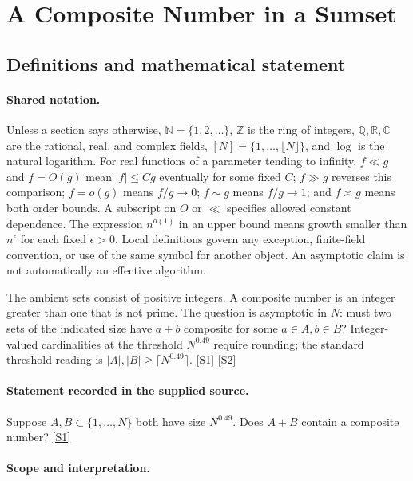 \documentclass[11pt,a4paper]{article}
\newcommand{\N}{\mathbb{N}}
\newcommand{\Z}{\mathbb{Z}}
\newcommand{\Q}{\mathbb{Q}}
\newcommand{\R}{\mathbb{R}}
\newcommand{\C}{\mathbb{C}}
\newcommand{\sref}[2]{\hyperlink{source:#1:#2}{[S#2]}}
\begin{document}
\section{A Composite Number in a Sumset}\label{statement}


\subsection{Definitions and mathematical statement}

\paragraph{Shared notation.}Unless a section says otherwise, $\N=\{1,2,\ldots\}$,
$\Z$ is the ring of integers, $\Q,\R,\C$ are the rational, real, and complex
fields, $[N]=\{1,\ldots,\lfloor N\rfloor\}$, and $\log$ is the natural
logarithm. For real functions of a parameter tending to infinity,
$f\ll g$ and $f=O(g)$ mean $|f|\leq Cg$ eventually for some fixed $C$;
$f\gg g$ reverses this comparison; $f=o(g)$ means $f/g\to0$;
$f\sim g$ means $f/g\to1$; and $f\asymp g$ means both order bounds.
A subscript on $O$ or $\ll$ specifies allowed constant dependence.
The expression $n^{o(1)}$ in an upper bound means growth smaller than
$n^\epsilon$ for each fixed $\epsilon>0$. Local definitions govern any
exception, finite-field convention, or use of the same symbol for another
object. An asymptotic claim is not automatically an effective algorithm.



The ambient sets consist of positive integers. A composite number is an integer greater than one that is not prime. The question is asymptotic in $N$: must two sets of the indicated size have $a+b$ composite for some $a\in A,b\in B$? Integer-valued cardinalities at the threshold $N^{0.49}$ require rounding; the standard threshold reading is $|A|,|B|\geq\lceil N^{0.49}\rceil$. \sref{statement}{1} \sref{statement}{2}

\paragraph{Statement recorded in the supplied source.}
Suppose $A, B \subset \{1, \dots, N\}$ both have size $N^{0.49}$. Does $A + B$ contain a composite number? \sref{statement}{1}

\paragraph{Scope and interpretation.}
\end{document}
